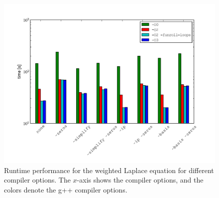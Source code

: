 \begin{figure}
  \center\includegraphics[width=\largefig]{chapters/oelgaard-2/pdf/runtime_laplace.pdf}
  \caption{Runtime performance for the weighted Laplace equation for
    different compiler options.  The $x$-axis shows the \ffc{}
    compiler options, and the colors denote the g++ compiler
    options.}
  \label{oelgaard-2:fig:laplace_stats_2}
\end{figure}


